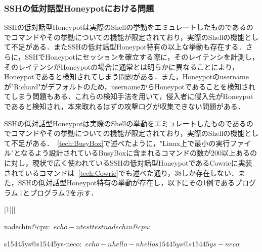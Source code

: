\subsubsection{SSHの低対話型Honeypotにおける問題}
\label{appr:problemofSshLowHoneypot}
SSHの低対話型Honeypotは実際のShellの挙動をエミュレートしたものであるのでコマンドやその挙動についての機能が限定されており，実際のShellの機能として不足がある．またSSHの低対話型Honeypot特有の以上な挙動も存在する．さらに，SSHでHoneypotにセッションを確立する際に，そのレイテンシを計測し，そのレイテンシがHoneypotの場合に通常とは明らかに異なることにより，Honeypotであると検知されてしまう問題がある．また，Honeypotのusernameが"Richard"がデフォルトのため，usernameからHoneypotであることを検知されてしまう問題もある．これらの検知手法を用いて，侵入者に侵入先がHoneypotであると検知され，本来取れるはずの攻撃ログが収集できない問題がある．

\label{appr:LowHoneypotLatency}

\label{appr:LowHoneypotUsername}

\label{appr:LowHoneypotCommand}
SSHの低対話型Honeypotは実際のShellの挙動をエミュレートしたものであるのでコマンドやその挙動についての機能が限定されており，実際のShellの機能として不足がある．~\ref{tech:BusyBox}で述べたように，"Linux上で最小の実行ファイル"となるよう設計されているBusyBoxに含まれるコマンドの数が200以上あるのに対し，現状で広く使われているSSHの低対話型HoneypotであるCowrieに実装されているコマンドは~\ref{tech:Cowrie}でも述べた通り，38しか存在しない．また，SSHの低対話型Honeypot特有の挙動が存在し，以下にその1例であるプログラム\,1とプログラム\,2を示す．

\vspace{5mm}
[1][]
    {\lstset{
        frame=single,
        basicstyle=\ttfamily,
        numbers=left,
        numbersep=10pt,
        tabsize=2,
        extendedchars=true,
        xleftmargin=17pt,
        framexleftmargin=17pt,
        #1
    }
}{}

\begin{mylisting}[language=sh,caption=正しいShellの挙動]
nadechin@cpu:~$ echo -n test
testnadechin@cpu:~$
\end{mylisting}

\begin{mylisting}[language=sh,caption=Kippo特有の異常な挙動の例]
s15445ys@s15445ys-neco:~$ echo -n hello
-n hello
s15445ys@s15445ys-neco:~$
\end{mylisting}


